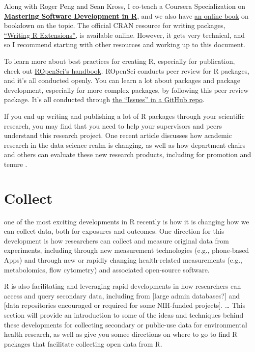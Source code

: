 \documentclass[]{tufte-book}
\begin{document}
Along with Roger Peng and Sean Kross, I co-teach a Coursera Specialization on
\href{https://www.coursera.org/specializations/r}{\textbf{Mastering Software Development in
R}}, and we also have \href{https://bookdown.org/rdpeng/RProgDA/}{an online
book} on bookdown on the topic. The
official CRAN resource for writing packages, \href{https://cran.r-project.org/doc/manuals/r-release/R-exts.html}{``Writing R
Extensions''}, is
available online. However, it gets very technical, and so I recommend starting
with other resources and working up to this document.

To learn more about best practices for creating R, especially for publication,
check out \href{https://ropensci.github.io/dev_guide/}{ROpenSci's handbook}. ROpenSci
conducts peer review for R packages, and it's all conducted openly. You can
learn a lot about packages and package development, especially for more complex
packages, by following this peer review package. It's all conducted through \href{https://github.com/ropensci/software-review/issues}{the
``Issues'' in a GitHub repo}.

If you end up writing and publishing a lot of R packages through your scientific
research, you may find that you need to help your supervisors and peers
understand this research project. One recent article discusses how academic
research in the data science realm is changing, as well as how department chairs
and others can evaluate these new research products, including for promotion and
tenure \citep{waller2018documenting}.

\hypertarget{collect}{%
\chapter{Collect}\label{collect}}

 one of the most exciting
developments in R recently is how it is changing how we can collect data, both for
exposures and outcomes. One direction for this development is how researchers can
collect and measure original data from experiments, including through new measurement
technologies (e.g., phone-based Apps) and through new or rapidly changing health-related
measurements (e.g., metabolomics, flow cytometry) and associated open-source
software.

R is also facilitating and leveraging rapid developments in how researchers can access and
query secondary data, including from {[}large admin databases?{]} and {[}data repositories
encouraged or required for some NIH-funded projects{]}. \ldots{} This section will provide an
introduction to some of the ideas and techniques behind these developments for
collecting secondary or public-use data for environmental health research, as well as
give you somee directions on where to go to find R packages that facilitate collecting
open data from R.
\end{document}
